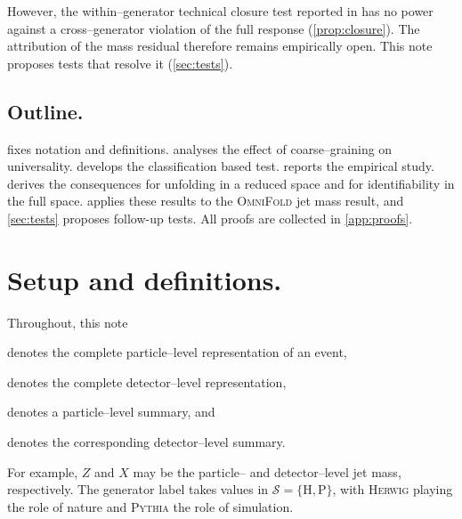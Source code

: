 \documentclass[12pt]{article}
\newcommand{\Herwig}{\mathrm{H}}
\newcommand{\Pythia}{\mathrm{P}}
\newcommand{\Gens}{\mathcal{S}}
\newcommand{\1}{\mathbbm{1}}
\renewcommand{\[}{\begin{equation}}
\renewcommand{\]}{\end{equation}}
\begin{document}
\begin{enumerate}
        However, the within--generator technical closure test reported in \textcite{Andreassen:2019cjw} has no power against a cross--generator violation of the full response (\cref{prop:closure}).
        The attribution of the mass residual therefore remains empirically open. This note proposes tests that resolve it (\cref{sec:tests}).
    \end{enumerate}

    \subsection{Outline.}
     fixes notation and definitions.
     analyses the effect of coarse--graining on universality.
     develops the classification based test.
     reports the empirical study.
     derives the consequences for unfolding in a reduced space and for identifiability in the full space.
     applies these results to the \textsc{OmniFold} jet mass result, and \cref{sec:tests} proposes follow-up tests.
    All proofs are collected in \cref{app:proofs}.

\section{Setup and definitions.}
\label{sec:setup}

    Throughout, this note
    \begin{description}[
      align=right,
      labelwidth=2.8cm,
      labelsep=0.3cm,
      itemsep=0.2ex,
      font=\normalfont
    ]
      \item[\(T \in \mathcal T\)] denotes the complete particle--level representation of an event,
      \item[\(Y \in \mathcal Y\)] denotes the complete detector--level representation,
      \item[\(Z = f(T)\in\mathcal Z\)] denotes a particle--level summary, and
      \item[\(X = g(Y)\in\mathcal X\)] denotes the corresponding detector--level summary.
    \end{description}
    
    For example, \(Z\) and \(X\) may be the particle-- and detector--level jet mass, respectively.
    The generator label takes values in \(\Gens = \{\Herwig,\Pythia\}\), with \textsc{Herwig} playing the role of nature and \textsc{Pythia} the role of simulation.
\end{document}
